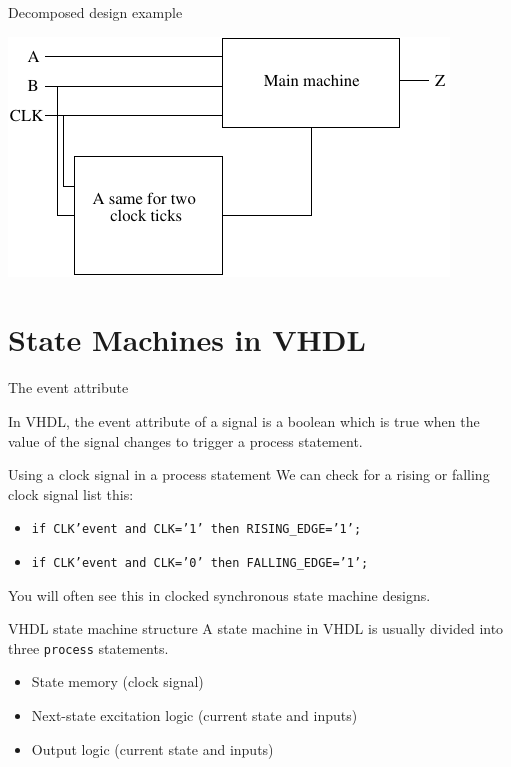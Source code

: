 \begin{frame}{Decomposed design example}
  \begin{center}
    \includegraphics[scale=1.3]{DecomposedStateMachine}
  \end{center}
\end{frame}

\section{State Machines in VHDL}

\begin{frame}{The event attribute}
  \begin{definition}
    In VHDL, the \alert{event} attribute of a signal is a boolean which is true when the value of the signal changes to trigger a process statement.
  \end{definition}
  \begin{block}{Using a clock signal in a process statement}
    We can check for a rising or falling clock signal list this:
    \begin{itemize}
      \item \texttt{if CLK'event and CLK='1' then RISING\_EDGE='1';}
      \item \texttt{if CLK'event and CLK='0' then FALLING\_EDGE='1';}
    \end{itemize}
  \end{block}
  You will often see this in clocked synchronous state machine designs.
\end{frame}

\begin{frame}{VHDL state machine structure}
  A state machine in VHDL is usually divided into three \texttt{process} statements.
  \begin{itemize}
    \item State memory (clock signal)
    \item Next-state excitation logic (current state and inputs)
    \item Output logic (current state and inputs)
  \end{itemize}
\end{frame}

